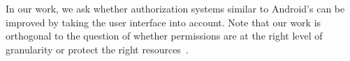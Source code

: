 In our work, we ask whether authorization systems similar to
Android's can be improved by taking the user interface into account.
Note that our work is orthogonal to the question of whether
permissions are at the right level of granularity
\cite{jsjeon:spsm12,Bugiel:2013} or protect the right
resources~\cite{Felt:2012spsm}.



